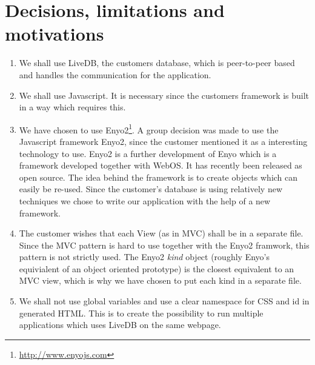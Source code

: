 \documentclass[a4paper, 12pt, titlepage]{article}
\begin{document}
\section{Decisions, limitations and motivations}

\begin{enumerate}

	\item We shall use LiveDB,  the customers database, which is peer-to-peer based
	and handles the communication for the application.

	\item We shall use Javascript. It is necessary since the customers framework is built in a way which requires this.

	\cbstart
    \item We have chosen to use Enyo2\footnote{\url{http://www.enyojs.com}}. A group decision was made to use the Javascript framework Enyo2, since the customer mentioned it as a interesting technology to use.
	Enyo2 is a further development of Enyo which is a framework developed together with WebOS. It has recently been released as open source. The idea behind the framework is to create objects which can easily be re-used. Since the customer's database is using relatively new techniques we chose to write our application with the help of a new framework.
	\cbend

	\item The customer wishes that each View (as in MVC) shall be in a separate file. Since the MVC pattern is hard to use together with the Enyo2 framwork, this pattern is not strictly used. The Enyo2 \emph{kind} object (roughly Enyo's equivialent of an object oriented prototype) is the closest equivalent to an MVC view, which is why we have chosen to put each kind in a separate file.

	      
	\cbstart      
	\item We shall not use global variables and use a clear namespace for CSS and id in generated HTML. 
	This is to create the possibility to run multiple applications which uses LiveDB on the same webpage.
	\cbend
      

\end{enumerate}
\end{document}
